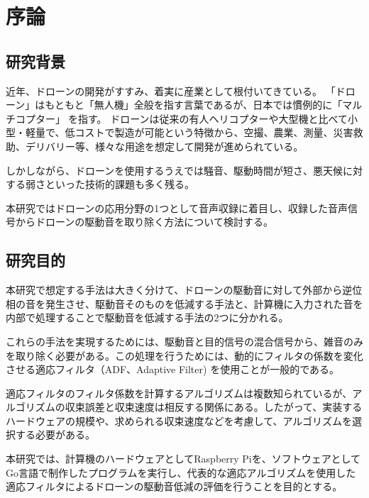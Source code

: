 \chapter{序論}\label{introduction}

\section{研究背景}\label{research-background}

近年、ドローンの開発がすすみ、着実に産業として根付いてきている。
「ドローン」はもともと「無人機」全般を指す言葉であるが、日本では慣例的に「マルチコプター」を指す。
ドローンは従来の有人ヘリコプターや大型機と比べて小型・軽量で、低コストで製造が可能という特徴から、空撮、農業、測量、災害救助、デリバリー等、様々な用途を想定して開発が進められている。

しかしながら、ドローンを使用するうえでは騒音、駆動時間が短さ、悪天候に対する弱さといった技術的課題も多く残る。

本研究ではドローンの応用分野の1つとして音声収録に着目し、収録した音声信号からドローンの駆動音を取り除く方法について検討する。

\newpage

\section{研究目的}\label{ux7814ux7a76ux76eeux7684}

本研究で想定する手法は大きく分けて、ドローンの駆動音に対して外部から逆位相の音を発生させ、駆動音そのものを低減する手法と、計算機に入力された音を内部で処理することで駆動音を低減する手法の2つに分かれる。

これらの手法を実現するためには、駆動音と目的信号の混合信号から、雑音のみを取り除く必要がある。この処理を行うためには、動的にフィルタの係数を変化させる適応フィルタ（ADF、Adaptive
Filter) を使用ことが一般的である。

適応フィルタのフィルタ係数を計算するアルゴリズムは複数知られているが、アルゴリズムの収束誤差と収束速度は相反する関係にある。したがって、実装するハードウェアの規模や、求められる収束速度などを考慮して、アルゴリズムを選択する必要がある。

本研究では、計算機のハードウェアとしてRaspberry
Piを、ソフトウェアとしてGo言語で制作したプログラムを実行し、代表的な適応アルゴリズムを使用した適応フィルタによるドローンの駆動音低減の評価を行うことを目的とする。
